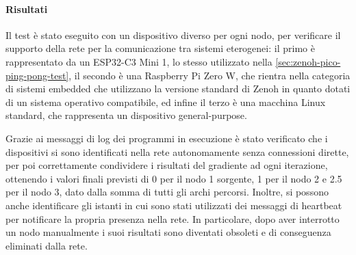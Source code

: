 \paragraph{Risultati}
Il test è stato eseguito con un dispositivo diverso per ogni nodo, per verificare
il supporto della rete per la comunicazione tra sistemi eterogenei: il primo è
rappresentato da un ESP32-C3 Mini 1, lo stesso utilizzato nella \cref{sec:zenoh-pico-ping-pong-test},
il secondo è una Raspberry Pi Zero W, che rientra nella categoria di sistemi embedded
che utilizzano la versione standard di Zenoh in quanto dotati di un sistema operativo
compatibile, ed infine il terzo è una macchina Linux standard, che rappresenta
un dispositivo general-purpose.

Grazie ai messaggi di log dei programmi in esecuzione è stato verificato che i
dispositivi si sono identificati nella rete autonomamente senza connessioni dirette,
per poi correttamente condividere i risultati del gradiente ad ogni iterazione,
ottenendo i valori finali previsti di 0 per il nodo 1 sorgente, 1 per il nodo 2
e 2.5 per il nodo 3, dato dalla somma di tutti gli archi percorsi.
Inoltre, si possono anche identificare gli istanti in cui sono stati
utilizzati dei messaggi di heartbeat per notificare la propria presenza nella rete.
In particolare, dopo aver interrotto un nodo manualmente i suoi risultati sono
diventati obsoleti e di conseguenza eliminati dalla rete.
